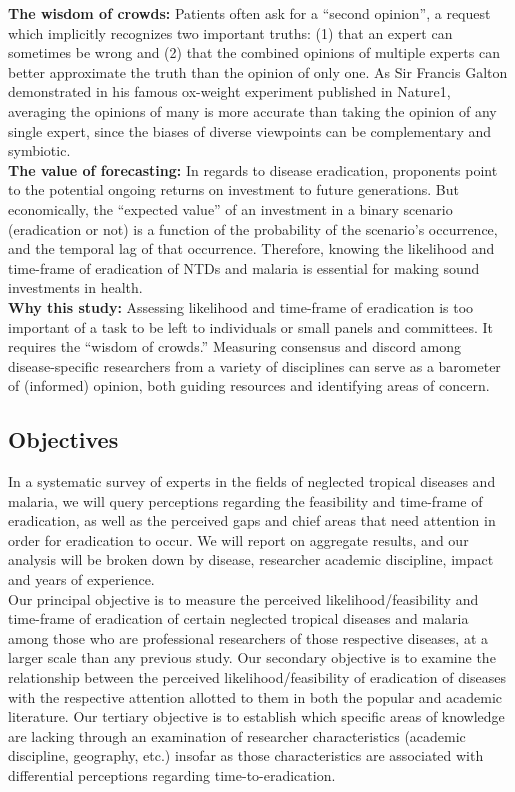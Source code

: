 \documentclass{article}
\begin{document}
\noindent \textbf{The wisdom of crowds:} Patients often ask for a “second opinion”, a request which implicitly recognizes two important truths: (1) that an expert can sometimes be wrong and (2) that the combined opinions of multiple experts can better approximate the truth than the opinion of only one. As Sir Francis Galton demonstrated in his famous ox-weight experiment published in Nature1, averaging the opinions of many is more accurate than taking the opinion of any single expert, since the biases of diverse viewpoints can be complementary and symbiotic. \\

\noindent \textbf{The value of forecasting:} In regards to disease eradication, proponents point to the potential ongoing returns on investment to future generations. But economically, the “expected value” of an investment in a binary scenario (eradication or not) is a function of the probability of the scenario’s occurrence, and the temporal lag of that occurrence. Therefore, knowing the likelihood and time-frame of eradication of NTDs and malaria is essential for making sound investments in health. \\

\noindent \textbf{Why this study:} Assessing likelihood and time-frame of eradication is too important of a task to be left to individuals or small panels and committees. It requires the “wisdom of crowds.” Measuring consensus and discord among disease-specific researchers from a variety of disciplines can serve as a barometer of (informed) opinion, both guiding resources and identifying areas of concern.

\subsection*{Objectives}


In a systematic survey of experts in the fields of neglected tropical diseases and malaria, we will query perceptions regarding the feasibility and time-frame of eradication, as well as the perceived gaps and chief areas that need attention in order for eradication to occur. We will report on aggregate results, and our analysis will be broken down by disease, researcher academic discipline, impact and years of experience. \\


\noindent Our principal objective is to measure the perceived likelihood/feasibility and time-frame of eradication of certain neglected tropical diseases and malaria among those who are professional researchers of those respective diseases, at a larger scale than any previous study. Our secondary objective is to examine the relationship between the perceived likelihood/feasibility of eradication of diseases with the respective attention allotted to them in both the popular and academic literature. Our tertiary objective is to establish which specific areas of knowledge are lacking through an examination of researcher characteristics (academic discipline, geography, etc.) insofar as those characteristics are associated with differential perceptions regarding time-to-eradication.
\end{document}
